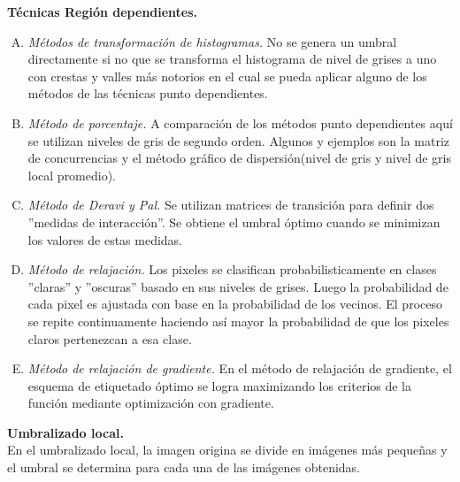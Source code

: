 \documentclass[12pt]{report}
\begin{document}
\textbf{ Técnicas Región dependientes.} 
\begin{enumerate}[A.]
\item \textit{Métodos de transformación de histogramas.} No se genera un umbral directamente si no que se transforma el histograma de nivel de grises a uno con crestas y valles más notorios en el cual se pueda aplicar alguno de los métodos de las técnicas punto dependientes.

\item \textit{Método de porcentaje.} A comparación de los métodos punto dependientes aquí se utilizan niveles de gris de segundo orden. Algunos  y ejemplos son la matriz de concurrencias y el método gráfico de dispersión(nivel de gris y nivel de gris local promedio).

\item \textit{Método de Deravi y Pal.} Se utilizan matrices de transición para definir dos ''medidas de interacción''. Se obtiene el umbral óptimo cuando se minimizan los valores de estas medidas.

\item \textit{Método de relajación.} Los pixeles se clasifican probabilisticamente en clases ''claras'' y ''oscuras'' basado en sus niveles de grises. Luego la probabilidad de cada pixel es ajustada con base en la probabilidad de los vecinos. El proceso se repite continuamente haciendo así mayor la probabilidad de que los pixeles claros pertenezcan a esa clase. 

\item \textit{Método de relajación de gradiente.} En el método de relajación de gradiente, el esquema de etiquetado óptimo se logra maximizando  los criterios de la función mediante optimización con gradiente.
\end{enumerate}

\textbf{ Umbralizado local.}\\
En el umbralizado local, la imagen origina se divide en imágenes más pequeñas y el umbral se determina para cada una de las imágenes obtenidas.
\end{document}
